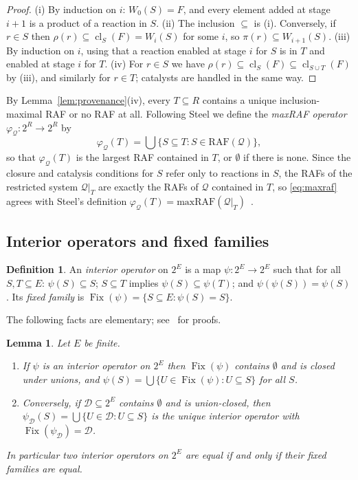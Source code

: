 \documentclass[11pt,a4paper]{article}
\theoremstyle{plain}
\newtheorem{lemma}[theorem]{Lemma}
\theoremstyle{definition}
\newtheorem{definition}[theorem]{Definition}
\theoremstyle{remark}
\newcommand{\Fix}{\operatorname{Fix}}
\newcommand{\cl}{\operatorname{cl}}
\newcommand{\RAF}{\mathrm{RAF}}
\newcommand{\cD}{\mathcal{D}}
\newcommand{\cQ}{\mathcal{Q}}
\newcommand{\pw}[1]{2^{#1}}
\begin{document}
\begin{proof}
(i) By induction on $i$: $W_0(S)=F$, and every element added at stage $i+1$ is a product of a reaction in $S$. (ii) The inclusion $\subseteq$ is (i). Conversely, if $r\in S$ then $\rho(r)\subseteq\cl_S(F)=W_i(S)$ for some $i$, so $\pi(r)\subseteq W_{i+1}(S)$. (iii) By induction on $i$, using that a reaction enabled at stage $i$ for $S$ is in $T$ and enabled at stage $i$ for $T$. (iv) For $r\in S$ we have $\rho(r)\subseteq\cl_S(F)\subseteq\cl_{S\cup T}(F)$ by (iii), and similarly for $r\in T$; catalysts are handled in the same way.
\end{proof}

By Lemma~\ref{lem:provenance}(iv), every $T\subseteq R$ contains a unique inclusion-maximal RAF or no RAF at all. Following Steel we define the \emph{maxRAF operator} $\varphi_{\cQ}\colon\pw{R}\to\pw{R}$ by
\begin{equation}\label{eq:maxraf}
\varphi_{\cQ}(T)=\bigcup\{S\subseteq T: S\in\RAF(\cQ)\},
\end{equation}
so that $\varphi_{\cQ}(T)$ is the largest RAF contained in $T$, or $\emptyset$ if there is none. Since the closure and catalysis conditions for $S$ refer only to reactions in $S$, the RAFs of the restricted system $\cQ|_T$ are exactly the RAFs of $\cQ$ contained in $T$, so \eqref{eq:maxraf} agrees with Steel's definition $\varphi_{\cQ}(T)=\mathrm{maxRAF}(\cQ|_T)$~\cite[Eq.~(3)]{steel2023interior}.

\subsection{Interior operators and fixed families}

\begin{definition}
An \emph{interior operator} on $\pw{E}$ is a map $\psi\colon\pw{E}\to\pw{E}$ such that for all $S,T\subseteq E$: $\psi(S)\subseteq S$; $S\subseteq T$ implies $\psi(S)\subseteq\psi(T)$; and $\psi(\psi(S))=\psi(S)$. Its \emph{fixed family} is $\Fix(\psi)=\{S\subseteq E:\psi(S)=S\}$.
\end{definition}

The following facts are elementary; see~\cite[Lemma~1]{steel2023interior} for proofs.

\begin{lemma}\label{lem:interior}
Let $E$ be finite.
\begin{enumerate}[label=(\roman*)]
\item If $\psi$ is an interior operator on $\pw{E}$ then $\Fix(\psi)$ contains $\emptyset$ and is closed under unions, and $\psi(S)=\bigcup\{U\in\Fix(\psi): U\subseteq S\}$ for all $S$.
\item Conversely, if $\cD\subseteq\pw{E}$ contains $\emptyset$ and is union-closed, then $\psi_{\cD}(S)=\bigcup\{U\in\cD: U\subseteq S\}$ is the unique interior operator with $\Fix(\psi_{\cD})=\cD$.
\end{enumerate}
In particular two interior operators on $\pw{E}$ are equal if and only if their fixed families are equal.
\end{lemma}
\end{document}
